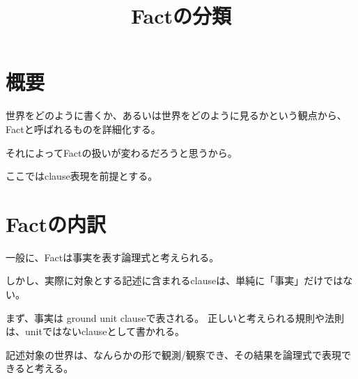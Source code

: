 \documentclass[10pt, onecolumn]{jarticle}   	%
\title{Factの分類}
\author{\myname}
\date{}					%
\begin{document}
\maketitle

\section{概要}
世界をどのように書くか、あるいは世界をどのように見るかという観点から、
Factと呼ばれるものを詳細化する。

それによってFactの扱いが変わるだろうと思うから。

ここではclause表現を前提とする。

%

\section{Factの内訳}
一般に、Factは事実を表す論理式と考えられる。

しかし、実際に対象とする記述に含まれるclauseは、単純に「事実」だけではない。

まず、事実は ground unit clauseで表される。
正しいと考えられる規則や法則は、unitではないclauseとして書かれる。

記述対象の世界は、なんらかの形で観測/観察でき、その結果を論理式で表現できると考える。
\end{document}
